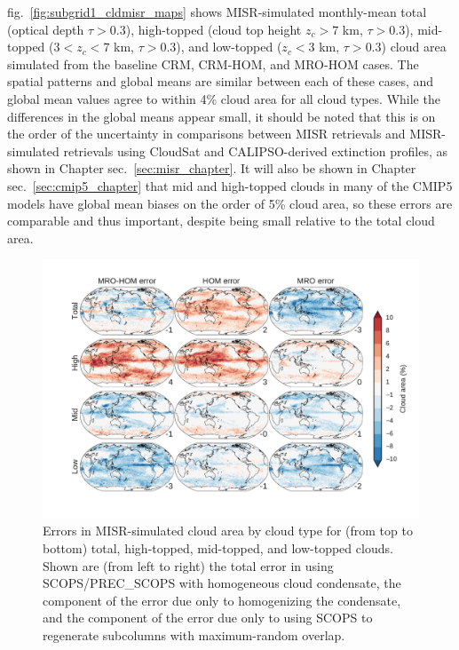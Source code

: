 fig.~\ref{fig:subgrid1_cldmisr_maps} shows MISR-simulated monthly-mean
total (optical depth \(\tau > 0.3\)), high-topped (cloud top height
\(z_c > 7\) km, \(\tau > 0.3\)), mid-topped (\(3 < z_c < 7\) km,
\(\tau > 0.3\)), and low-topped (\(z_c < 3\) km, \(\tau > 0.3\)) cloud
area simulated from the baseline CRM, CRM-HOM, and MRO-HOM cases. The
spatial patterns and global means are similar between each of these
cases, and global mean values agree to within 4\% cloud area for all
cloud types. While the differences in the global means appear small, it
should be noted that this is on the order of the uncertainty in
comparisons between MISR retrievals and MISR-simulated retrievals using
CloudSat and CALIPSO-derived extinction profiles, as shown in Chapter
sec.~\ref{sec:misr_chapter}. It will also be shown in Chapter
sec.~\ref{sec:cmip5_chapter} that mid and high-topped clouds in many of
the CMIP5 models have global mean biases on the order of 5\% cloud area,
so these errors are comparable and thus important, despite being small
relative to the total cloud area.

\begin{figure}[htbp]
\centering
\includegraphics{graphics/subgrid1_cldmisr_maps_diff.pdf}
\caption{\label{fig:subgrid1_cldmisr_maps_diff}Errors in MISR-simulated
cloud area by cloud type for (from top to bottom) total, high-topped,
mid-topped, and low-topped clouds. Shown are (from left to right) the
total error in using SCOPS/PREC\_SCOPS with homogeneous cloud
condensate, the component of the error due only to homogenizing the
condensate, and the component of the error due only to using SCOPS to
regenerate subcolumns with maximum-random
overlap.}\label{fig:subgrid1ux5fcldmisrux5fmapsux5fdiff}
\end{figure}

